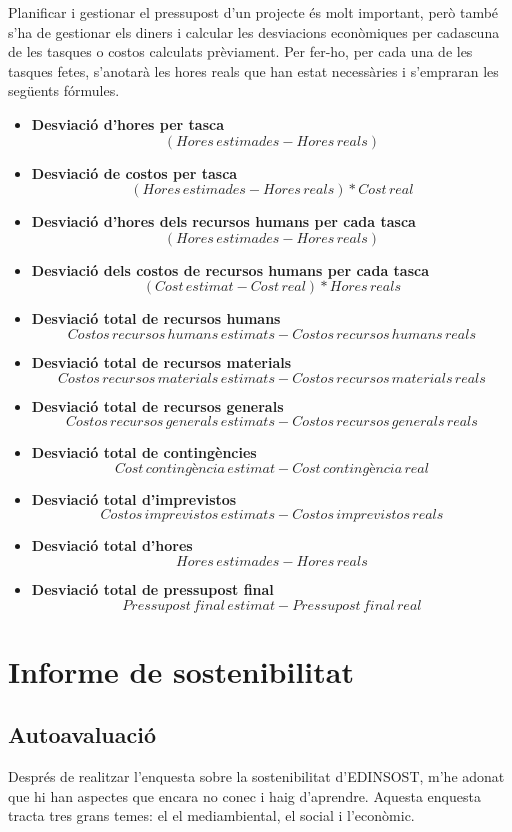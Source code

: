 \documentclass[a4paper]{article}
\begin{document}
Planificar i gestionar el pressupost d'un projecte és molt important, però també s'ha de gestionar els diners i calcular les desviacions econòmiques per cadascuna de les tasques o costos calculats prèviament. Per fer-ho, per cada una de les tasques fetes, s'anotarà les hores reals que han estat necessàries i s'empraran les següents fórmules.
\begin{itemize}
    \item \textbf{Desviació d'hores per tasca}
    \[(Hores\,estimades - Hores\,reals)\]
    \item \textbf{Desviació de costos per tasca}
    \[(Hores\,estimades - Hores\,reals) * Cost\,real\]
    \item \textbf{Desviació d'hores dels recursos humans per cada tasca}
    \[(Hores\,estimades - Hores\,reals)\]
    \item \textbf{Desviació dels costos de recursos humans per cada tasca}
    \[(Cost\, estimat - Cost\,real) * Hores\,reals\]
    \item \textbf{Desviació total de recursos humans}
    \[Costos\,recursos\,humans\,estimats - Costos\,recursos\,humans\,reals\]
    \item \textbf{Desviació total de recursos materials}
    \[Costos\,recursos\,materials\,estimats - Costos\,recursos\,materials\,reals\]
    \item \textbf{Desviació total de recursos generals}
    \[Costos\,recursos\,generals\,estimats - Costos\,recursos\,generals\,reals\]
    \item \textbf{Desviació total de contingències}
    \[Cost\,contingència\,estimat - Cost\,contingència\,real\]
    \item \textbf{Desviació total d'imprevistos}
    \[Costos\,imprevistos\,estimats - Costos\,imprevistos\,reals\]
    \item \textbf{Desviació total d'hores}
    \[Hores\,estimades - Hores\,reals\]
    \item \textbf{Desviació total de pressupost final}
    \[Pressupost\,final\,estimat - Pressupost\,final\,real\]
\end{itemize}

\newpage
\section{Informe de sostenibilitat}
\subsection{Autoavaluació}
Després de realitzar l'enquesta sobre la sostenibilitat d'EDINSOST, m'he adonat que hi han aspectes que encara no conec i haig d'aprendre. Aquesta enquesta tracta  tres grans temes: el el mediambiental, el social i l'econòmic.
\end{document}

